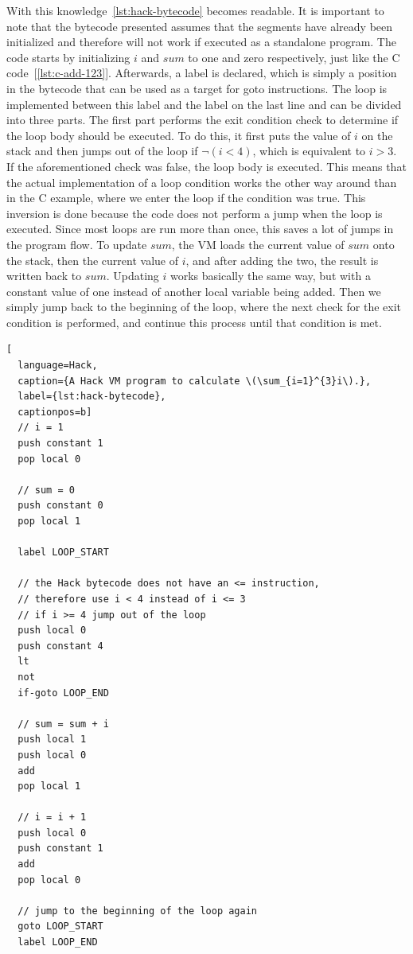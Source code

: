 With this knowledge~\cref{lst:hack-bytecode} becomes readable.
It is important to note that the bytecode presented assumes that the segments have already been initialized and therefore will not work if executed as a standalone program.
The code starts by initializing \(i\) and \(sum\) to one and zero respectively, just like the C code~[\ref{lst:c-add-123}].
Afterwards, a label is declared, which is simply a position in the bytecode that can be used as a target for goto instructions.
The loop is implemented between this label and the label on the last line and can be divided into three parts.
The first part performs the exit condition check to determine if the loop body should be executed.
To do this, it first puts the value of \(i\) on the stack and then jumps out of the loop if \(\neg(i < 4)\), which is equivalent to \(i > 3\).
If the aforementioned check was false, the loop body is executed.
This means that the actual implementation of a loop condition works the other way around than in the C example, where we enter the loop if the condition was true.
This inversion is done because the code does not perform a jump when the loop is executed.
Since most loops are run more than once, this saves a lot of jumps in the program flow.
To update \(sum\), the VM loads the current value of \(sum\) onto the stack, then the current value of \(i\), and after adding the two, the result is written back to \(sum\).
Updating \(i\) works basically the same way, but with a constant value of one instead of another local variable being added.
Then we simply jump back to the beginning of the loop, where the next check for the exit condition is performed, and continue this process until that condition is met.

\begin{lstlisting}[
  language=Hack,
  caption={A Hack VM program to calculate \(\sum_{i=1}^{3}i\).},
  label={lst:hack-bytecode},
  captionpos=b]
  // i = 1
  push constant 1
  pop local 0

  // sum = 0
  push constant 0
  pop local 1

  label LOOP_START

  // the Hack bytecode does not have an <= instruction,
  // therefore use i < 4 instead of i <= 3
  // if i >= 4 jump out of the loop
  push local 0
  push constant 4
  lt
  not
  if-goto LOOP_END

  // sum = sum + i
  push local 1
  push local 0
  add
  pop local 1

  // i = i + 1
  push local 0
  push constant 1
  add
  pop local 0

  // jump to the beginning of the loop again
  goto LOOP_START
  label LOOP_END
\end{lstlisting}


